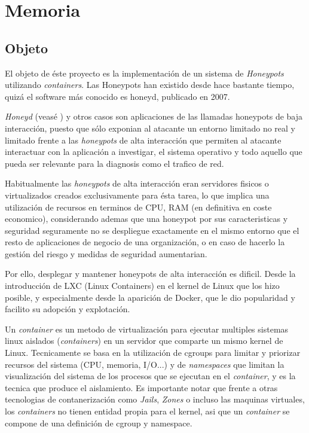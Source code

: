 \chapter{Memoria}
\minitoc{}
\section{Objeto}
El objeto de éste proyecto es la implementación de un sistema de \emph{Honeypots} utilizando \emph{containers}. 
Las Honeypots han existido desde hace bastante tiempo, quizá el software más conocido es honeyd, publicado en 2007.

\emph{Honeyd} (veasé \cite{honeynet-lowinteraction}) y otros casos son aplicaciones de las llamadas honeypots de baja interacción, puesto que sólo exponian al atacante un entorno limitado
no real y limitado frente a las \emph{honeypots} de alta interacción que permiten al atacante interactuar con la aplicación a investigar, el sistema operativo
y todo aquello que pueda ser relevante para la diagnosis como el trafico de red.

Habitualmente las \emph{honeypots} de alta interacción eran servidores fisicos o virtualizados creados exclusivamente para ésta tarea, lo que implica
una utilización de recursos en terminos de CPU, RAM (en definitiva en coste economico), considerando ademas que una honeypot por sus caracteristicas
y seguridad seguramente no se despliegue exactamente en el mismo entorno que el resto de aplicaciones de negocio de una organización, o en caso de hacerlo
la gestión del riesgo y medidas de seguridad aumentarian.

Por ello, desplegar y mantener honeypots de alta interacción es dificil. Desde la introducción de LXC (Linux Containers) en el kernel de Linux que los hizo posible, y
especialmente desde la aparición de Docker, que le dio popularidad y facilito su adopción y explotación.

Un \emph{container} es un metodo de virtualización para ejecutar multiples sistemas linux aislados (\emph{containers}) en un servidor que comparte un mismo kernel de Linux. Tecnicamente se basa en la utilización
de cgroups para limitar y priorizar recursos del sistema (CPU, memoria, I/O...) y de \emph{namespaces} que limitan la visualización del sistema de los procesos que se ejecutan en el \emph{container}, y es la tecnica que produce el aislamiento. Es importante notar que
frente a otras tecnologias de contanerización como \emph{Jails}, \emph{Zones} o incluso las maquinas virtuales, los \emph{containers} no tienen entidad propia para el kernel, asi que un \emph{container} se compone
de una definición de cgroup y namespace. 

